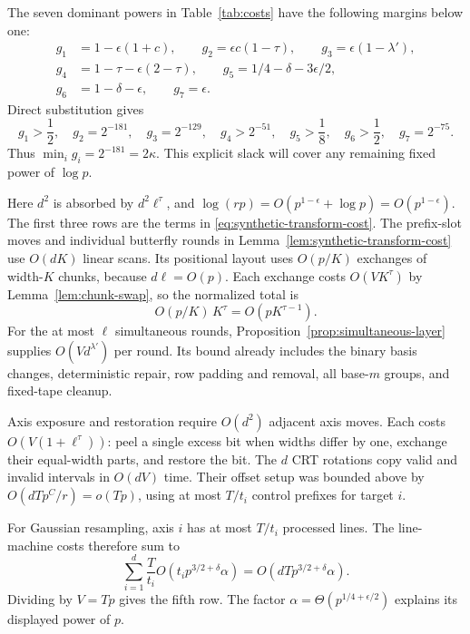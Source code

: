 \documentclass[11pt]{article}
\theoremstyle{definition}
\begin{document}
The seven dominant powers in Table~\ref{tab:costs} have the following
margins below one:
\begin{equation}\label{eq:margin-list}
\begin{split}
 g_1&=1-\epsilon(1+c),\qquad
 g_2=\epsilon c(1-\tau),\qquad
 g_3=\epsilon(1-\lambda'),\\
 g_4&=1-\tau-\epsilon(2-\tau),\qquad
 g_5=1/4-\delta-3\epsilon/2,\\
 g_6&=1-\delta-\epsilon,\qquad g_7=\epsilon.
\end{split}
\end{equation}
Direct substitution gives
\[
 g_1>\frac12,\quad g_2=2^{-181},\quad g_3=2^{-129},\quad
 g_4>2^{-51},\quad g_5>\frac18,\quad g_6>\frac12,\quad g_7=2^{-75}.
\]
Thus $\min_i g_i=2^{-181}=2\kappa$.  This explicit slack will cover
any remaining fixed power of $\log p$.

Here $d^2$ is absorbed by $d^2\ell^\tau$, and
$\log(rp)=O(p^{1-\epsilon}+\log p)=O(p^{1-\epsilon})$.
The first three rows are the terms in
\eqref{eq:synthetic-transform-cost}. The prefix-slot moves and
individual butterfly rounds in Lemma~\ref{lem:synthetic-transform-cost}
use $O(dK)$ linear scans. Its positional layout uses $O(p/K)$ exchanges
of width-$K$ chunks, because $d\ell=O(p)$. Each exchange costs
$O(VK^\tau)$ by Lemma~\ref{lem:chunk-swap}, so the normalized total is
\[
 O(p/K)\,K^\tau=O(pK^{\tau-1}).
\]
For the at most $\ell$ simultaneous rounds,
Proposition~\ref{prop:simultaneous-layer} supplies $O(Vd^{\lambda'})$
per round. Its bound already includes the binary basis changes,
deterministic repair, row padding and removal, all base-$m$ groups,
and fixed-tape cleanup.

Axis exposure and restoration require $O(d^2)$ adjacent axis moves.
Each costs $O(V(1+\ell^\tau))$: peel a single excess bit when widths
differ by one, exchange their equal-width parts, and restore the bit.
The $d$ CRT rotations copy valid and invalid intervals in $O(dV)$ time.
Their offset setup was bounded above by $O(dTp^C/r)=o(Tp)$,
using at most $T/t_i$ control prefixes for target $i$.

For Gaussian resampling, axis $i$ has at most $T/t_i$ processed lines.
The line-machine costs therefore sum to
\[
 \sum_{i=1}^d\frac{T}{t_i}
       O(t_i p^{3/2+\delta}\alpha)
 =O(dTp^{3/2+\delta}\alpha).
\]
Dividing by $V=Tp$ gives the fifth row.  The factor
$\alpha=\Theta(p^{1/4+\epsilon/2})$ explains its displayed power of $p$.
\end{document}
